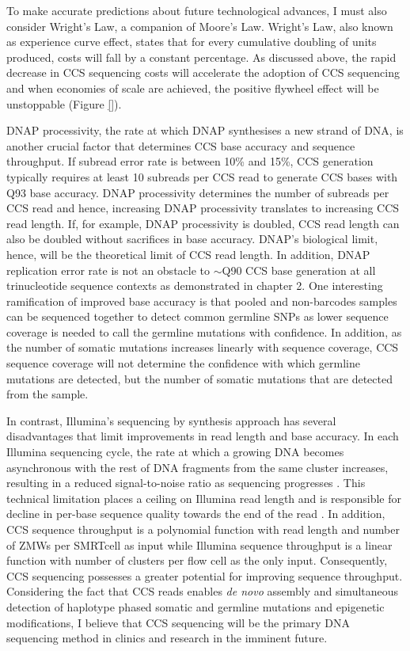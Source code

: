 To make accurate predictions about future technological advances, I must also consider Wright’s Law, a companion of Moore’s Law. Wright’s Law, also known as experience curve effect, states that for every cumulative doubling of units produced, costs will fall by a constant percentage. As discussed above, the rapid decrease in CCS sequencing costs will accelerate the adoption of CCS sequencing and when economies of scale are achieved, the positive flywheel effect will be unstoppable (Figure \ref{}). 

DNAP processivity, the rate at which DNAP synthesises a new strand of DNA, is another crucial factor that determines CCS base accuracy and sequence throughput. If subread error rate is between 10\% and 15\%, CCS generation typically requires at least 10 subreads per CCS read to generate CCS bases with Q93 base accuracy. DNAP processivity determines the number of subreads per CCS read and hence, increasing DNAP processivity translates to increasing CCS read length. If, for example, DNAP processivity is doubled, CCS read length can also be doubled without sacrifices in base accuracy. DNAP’s biological limit, hence, will be the theoretical limit of CCS read length. In addition, DNAP replication error rate is not an obstacle to $\sim$Q90 CCS base generation at all trinucleotide sequence contexts as demonstrated in chapter 2. One interesting ramification of improved base accuracy is that pooled and non-barcodes samples can be sequenced together to detect common germline SNPs as lower sequence coverage is needed to call the germline mutations with confidence. In addition, as the number of somatic mutations increases linearly with sequence coverage, CCS sequence coverage will not determine the confidence with which germline mutations are detected, but the number of somatic mutations that are detected from the sample. 

In contrast, Illumina’s sequencing by synthesis approach has several disadvantages that limit improvements in read length and base accuracy. In each Illumina sequencing cycle, the rate at which a growing DNA becomes asynchronous with the rest of DNA fragments from the same cluster increases, resulting in a reduced signal-to-noise ratio as sequencing progresses \cite{}. This technical limitation places a ceiling on Illumina read length and is responsible for decline in per-base sequence quality towards the end of the read \cite{}. In addition, CCS sequence throughput is a polynomial function with read length and number of ZMWs per SMRTcell as input while Illumina sequence throughput is a linear function with number of clusters per flow cell as the only input. Consequently, CCS sequencing possesses a greater potential for improving sequence throughput. Considering the fact that CCS reads enables \textit{de novo} assembly and simultaneous detection of haplotype phased somatic and germline mutations and epigenetic modifications, I believe that CCS sequencing will be the primary DNA sequencing method in clinics and research in the imminent future. 

